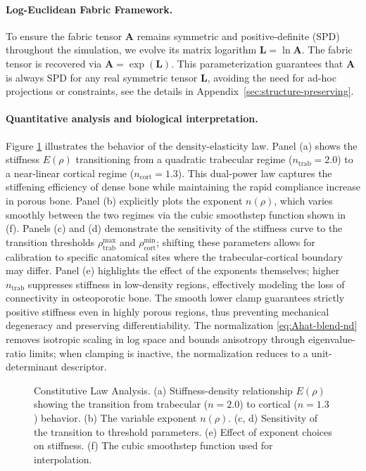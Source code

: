 \paragraph{Log-Euclidean Fabric Framework.}
To ensure the fabric tensor $\mathbf{A}$ remains symmetric and positive-definite (SPD) throughout the simulation, we evolve its matrix logarithm $\mathbf{L} = \ln \mathbf{A}$. The fabric tensor is recovered via $\mathbf{A} = \exp(\mathbf{L})$. This parameterization guarantees that $\mathbf{A}$ is always SPD for any real symmetric tensor $\mathbf{L}$, avoiding the need for ad-hoc projections or constraints, see the details in Appendix~\ref{sec:structure-preserving}.

\paragraph{Quantitative analysis and biological interpretation.}
Figure \ref{fig:constitutive_law} illustrates the behavior of the density-elasticity law. Panel (a) shows the stiffness $E(\rho)$ transitioning from a quadratic trabecular regime ($n_{\mathrm{trab}}=2.0$) to a near-linear cortical regime ($n_{\mathrm{cort}}=1.3$). This dual-power law captures the stiffening efficiency of dense bone while maintaining the rapid compliance increase in porous bone. Panel (b) explicitly plots the exponent $n(\rho)$, which varies smoothly between the two regimes via the cubic smoothstep function shown in (f). Panels (c) and (d) demonstrate the sensitivity of the stiffness curve to the transition thresholds $\rho_{\mathrm{trab}}^{\max}$ and $\rho_{\mathrm{cort}}^{\min}$; shifting these parameters allows for calibration to specific anatomical sites where the trabecular-cortical boundary may differ. Panel (e) highlights the effect of the exponents themselves; higher $n_{\mathrm{trab}}$ suppresses stiffness in low-density regions, effectively modeling the loss of connectivity in osteoporotic bone. The smooth lower clamp guarantees strictly positive stiffness even in highly porous regions, thus preventing mechanical degeneracy and preserving differentiability. The normalization \eqref{eq:Ahat-blend-nd} removes isotropic scaling in log space and bounds anisotropy through eigenvalue-ratio limits; when clamping is inactive, the normalization reduces to a unit-determinant descriptor.

\begin{figure}[htbp]
    \centering
    \caption{Constitutive Law Analysis. (a) Stiffness-density relationship $E(\rho)$ showing the transition from trabecular ($n=2.0$) to cortical ($n=1.3$) behavior. (b) The variable exponent $n(\rho)$. (c, d) Sensitivity of the transition to threshold parameters. (e) Effect of exponent choices on stiffness. (f) The cubic smoothstep function used for interpolation.}
    \label{fig:constitutive_law}
\end{figure}

